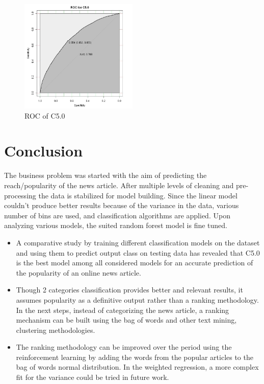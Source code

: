 \documentclass[sigchi]{acmart}
\begin{document}
\begin{figure}[h!]
    \caption{ROC of C5.0}
    \centering
    \includegraphics[width=0.50\textwidth]{ROCofC5.0JPG.JPG}
\end{figure}

\section{Conclusion}
The business problem was started with the aim of predicting the reach/popularity of the news article. After multiple levels of cleaning and pre-processing the data is stabilized for model building. Since the linear model couldn’t produce better results because of the variance in the data, various number of bins are used, and classification algorithms are applied. Upon analyzing various models, the suited random forest model is fine tuned.
\begin{itemize}
    \item A comparative study by training different classification models on the dataset and using them to predict output class on testing data has revealed that C5.0 is the best model among all considered models for an accurate prediction of the popularity of an online news article.
    \item Though 2 categories classification provides better and relevant results, it assumes popularity as a definitive output rather than a ranking methodology. In the next steps, instead of categorizing the news article, a ranking mechanism can be built using the bag of words and other text mining, clustering methodologies\cite{Popularity}. 
    \item The ranking methodology can be improved over the period using the reinforcement learning by adding the words from the popular articles to the bag of words normal distribution. In the weighted regression, a more complex fit for the variance could be tried in future work.
\end{itemize}




\end{document}

